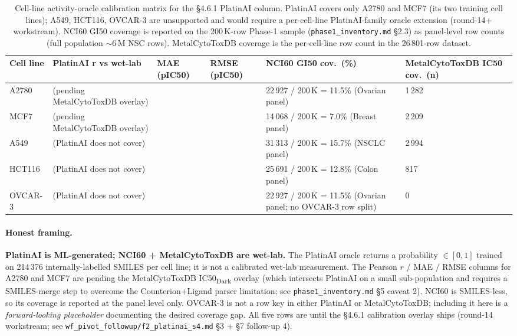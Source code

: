 \begin{table}[h]
\centering
\small
\begin{tabular}{p{2.0cm}p{2.4cm}p{2.0cm}p{2.0cm}p{2.0cm}p{2.4cm}}
\hline
\textbf{Cell line} & \textbf{PlatinAI r vs wet-lab} & \textbf{MAE (pIC50)} & \textbf{RMSE (pIC50)} & \textbf{NCI60 GI50 cov.\ (\%)} & \textbf{MetalCytoToxDB IC50 cov.\ (n)} \\
\hline
A2780       & \DESIGN{} (pending MetalCytoToxDB overlay) & \DESIGN{} & \DESIGN{} & 22\,927 / 200\,K = 11.5\% (Ovarian panel) & 1\,282 \\
MCF7        & \DESIGN{} (pending MetalCytoToxDB overlay) & \DESIGN{} & \DESIGN{} & 14\,068 / 200\,K = 7.0\% (Breast panel)   & 2\,209 \\
A549        & \DESIGN{} (PlatinAI does not cover)        & \DESIGN{} & \DESIGN{} & 31\,313 / 200\,K = 15.7\% (NSCLC panel)    & 2\,994 \\
HCT116      & \DESIGN{} (PlatinAI does not cover)        & \DESIGN{} & \DESIGN{} & 25\,691 / 200\,K = 12.8\% (Colon panel)    &   817 \\
OVCAR-3     & \DESIGN{} (PlatinAI does not cover)        & \DESIGN{} & \DESIGN{} & 22\,927 / 200\,K = 11.5\% (Ovarian panel; no OVCAR-3 row split) & 0 \\
\hline
\end{tabular}
\caption{Cell-line activity-oracle calibration matrix for the §4.6.1
PlatinAI column.  PlatinAI covers only A2780 and MCF7 (its two
training cell lines); A549, HCT116, OVCAR-3 are unsupported and
would require a per-cell-line PlatinAI-family oracle extension
(round-14+ workstream).  NCI60 GI50 coverage is reported on the
200\,K-row Phase-1 sample (\texttt{phase1\_inventory.md} \S2.3) as
panel-level row counts (full population $\sim$6\,M NSC rows).
MetalCytoToxDB coverage is the per-cell-line row count in the
26\,801-row dataset.}
\label{tab:s11-cell-line-calibration}
\end{table}

\paragraph{Honest framing.}
\textbf{PlatinAI is ML-generated; NCI60 + MetalCytoToxDB are wet-lab.}
The PlatinAI oracle returns a probability $\in [0,1]$ trained on
214\,376 internally-labelled SMILES per cell line; it is not a
calibrated wet-lab measurement.  The Pearson $r$ / MAE / RMSE columns
for A2780 and MCF7 are \DESIGN{} pending the MetalCytoToxDB
IC50\textsubscript{Dark} overlay (which intersects PlatinAI on a
small sub-population and requires a SMILES-merge step to overcome the
Counterion+Ligand parser limitation; see
\texttt{phase1\_inventory.md} \S5 caveat 2).  NCI60 is SMILES-less,
so its coverage is reported at the panel level only.  OVCAR-3 is not
a row key in either PlatinAI or MetalCytoToxDB; including it here is
a \emph{forward-looking placeholder} documenting the desired coverage
gap.  All five rows are \DESIGN{} until the §4.6.1 calibration overlay
ships (round-14 workstream; see \texttt{wf\_pivot\_followup/f2\_platinai\_s4.md}
\S3 + \S7 follow-up 4).


